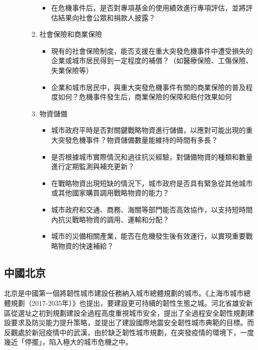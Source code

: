 \documentclass[a4paper,12pt]{article}
\begin{document}
\begin{enumerate}
\begin{enumerate}
\begin{enumerate}
\begin{itemize}
\item 在危機事件后，是否對專項基金的使用績效進行專項評估，並將評估結果向社會公眾和捐款人披露？\\
\end{itemize}
\item 社會保險和商業保險
\label{sec:org27d6c61}
\begin{itemize}
\item 現有的社會保險制度，能否支援在重大突發危機事件中遭受損失的企業或城市居民得到一定程度的補償？（如醫療保險、工傷保險、失業保險等）\\
\item 企業和城市居民中，與重大突發危機事件有關的商業保險的普及程度如何？危機事件發生后，商業保險的保障和賠付效果如何\\
\end{itemize}
\item 物資儲備
\label{sec:orgb7d9518}
\begin{itemize}
\item 城市政府平時是否對關鍵戰略物資進行儲備，以應對可能出現的重大突發危機事件？物資儲備數量能維持的時間有多長？\\
\item 是否根據城市實際情況和過往抗災經驗，對儲備物資的種類和數量進行定期監測與補充更新？\\
\item 在戰略物資出現短缺的情況下，城市政府是否具有緊急從其他城市或其他國家購買調用戰略物資的能力？\\
\item 城市政府和交通、商務、海關等部門能否高效協作，以支持短時間內抗災戰略物資的調用、運輸和分配？\\
\item 城市的災備相關產業，能否在危機發生後有效運行，以實現重要戰略物資的快速補給？\\
\end{itemize}
\end{enumerate}
\end{enumerate}
\end{enumerate}

\subsection{中國北京}
\label{sec:org386277e}
北京是中國第一個將韌性城市建設任務納入城市總體規劃的城市。《上海市城市總體規劃（2017-2035年）》也提出，要建設更可持續的韌性生態之城。河北省雄安新區從選址之初到規劃建設全過程高度重視城市安全，提出了全過程安全韌性規劃建設要求及防災能力提升策略，並提出了建設國際地震安全韌性城市典範的目標。而反觀處於新冠疫情中的武漢，由於缺乏韌性城市規劃，在突發疫情的環境下，一度幾近「停擺」，陷入極大的城市危機之中。\\
\end{document}
